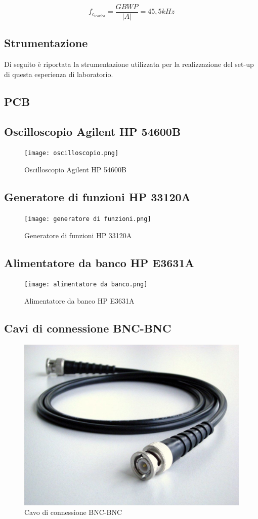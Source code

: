 \[f_{c_{teorica}}=\frac{GBWP}{|A|}=45,5kHz\]
\subsection{Strumentazione}
Di seguito è riportata la strumentazione utilizzata per la realizzazione del set-up di questa esperienza di laboratorio.
\subsection*{\textbf{PCB}}

\subsection*{\textbf{Oscilloscopio Agilent HP 54600B}}
\begin{figure}[h]
    \centering
    \texttt{[image: oscilloscopio.png]}
    \caption{Oscilloscopio Agilent HP 54600B}
    \label{fig:enter-label}
\end{figure}
\FloatBarrier
\subsection*{\textbf{Generatore di funzioni HP 33120A}}
\begin{figure}[h]
    \centering
    \texttt{[image: generatore di funzioni.png]}
    \caption{Generatore di funzioni HP 33120A}
    \label{fig:enter-label}
\end{figure}
\FloatBarrier
\subsection*{\textbf{Alimentatore da banco HP E3631A}}
\begin{figure}[h]
    \centering
    \texttt{[image: alimentatore da banco.png]}
    \caption{Alimentatore da banco HP E3631A}
    \label{fig:HPE3631A}
\end{figure}
\FloatBarrier
\subsection*{\textbf{Cavi di connessione BNC-BNC}}
\begin{figure}[h]
    \centering
    \includegraphics[width=0.75\linewidth]{media/cavoBNC.png}
    \caption{Cavo di connessione BNC-BNC}
    \label{fig:enter-label}
\end{figure}
\FloatBarrier
\clearpage

